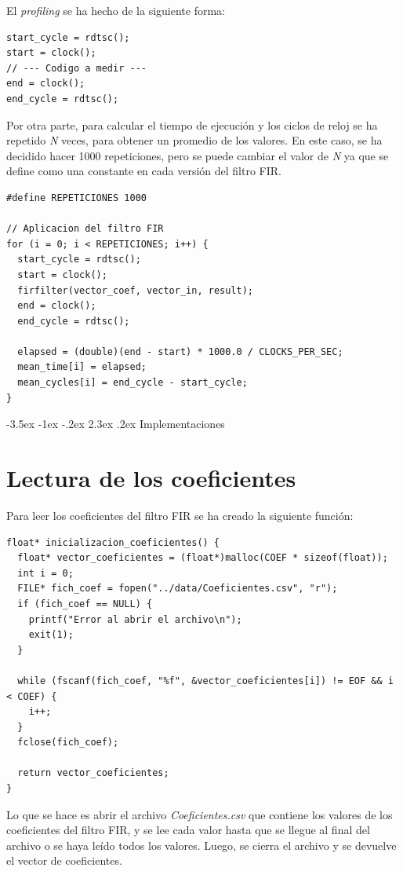 \documentclass[11pt]{report}
\makeatletter
\renewcommand\chapter{\@startsection{chapter}{0}{\z@}%
    {-3.5ex \@plus -1ex \@minus -.2ex}%
    {2.3ex \@plus.2ex}%
    {\normalfont\Large\bfseries}}
\makeatother
\begin{document}
El \emph{profiling} se ha hecho de la siguiente forma:
\begin{lstlisting}
start_cycle = rdtsc();
start = clock();
// --- Codigo a medir ---
end = clock();
end_cycle = rdtsc();
\end{lstlisting}

Por otra parte, para calcular el tiempo de ejecución y los ciclos de reloj se ha repetido \emph{N} veces, para obtener un promedio de los valores.
En este caso, se ha decidido hacer 1000 repeticiones, pero se puede cambiar el valor de \emph{N}
ya que se define como una constante en cada versión del filtro FIR.
\begin{lstlisting}
#define REPETICIONES 1000

// Aplicacion del filtro FIR
for (i = 0; i < REPETICIONES; i++) {
  start_cycle = rdtsc();
  start = clock();
  firfilter(vector_coef, vector_in, result);
  end = clock();
  end_cycle = rdtsc();

  elapsed = (double)(end - start) * 1000.0 / CLOCKS_PER_SEC;
  mean_time[i] = elapsed;
  mean_cycles[i] = end_cycle - start_cycle;
}
\end{lstlisting}

\newpage

\chapter{Implementaciones}
\section*{Lectura de los coeficientes}
Para leer los coeficientes del filtro FIR se ha creado la siguiente función:
\begin{lstlisting}
float* inicializacion_coeficientes() {
  float* vector_coeficientes = (float*)malloc(COEF * sizeof(float));
  int i = 0;
  FILE* fich_coef = fopen("../data/Coeficientes.csv", "r");
  if (fich_coef == NULL) {
    printf("Error al abrir el archivo\n");
    exit(1);
  }

  while (fscanf(fich_coef, "%f", &vector_coeficientes[i]) != EOF && i < COEF) {
    i++;
  }
  fclose(fich_coef);

  return vector_coeficientes;
}
\end{lstlisting}

Lo que se hace es abrir el archivo \emph{Coeficientes.csv} que contiene los valores de los coeficientes del filtro FIR, y se lee cada valor
hasta que se llegue al final del archivo o se haya leído todos los valores. Luego, se cierra el archivo y se devuelve el vector de coeficientes.
\end{document}
